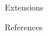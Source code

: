 \documentclass[final,hyperref={pdfpagelabels=false}]{beamer}
\begin{document}
\begin{frame}[t]
\begin{columns}[t]
\begin{column}{.3\textwidth}
    \begin{block}{Extensions}
    
    \end{block}
    
    

    \begin{block}{References}
      \linespread{0.928}\selectfont
      \footnotesize{
      }
    \end{block}
    
    

  \end{column} %

  \begin{column}{.02\textwidth}\end{column} %

\end{columns} %

\end{frame} %
\end{document}
